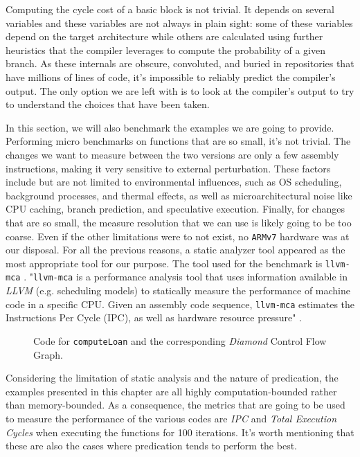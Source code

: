 Computing the cycle cost of a basic block is not trivial. It depends on several variables and these variables are not always in plain sight: some of these variables depend on the target architecture while others are calculated using further heuristics that the compiler leverages to compute the probability of a given branch. As these internals are obscure, convoluted, and buried in repositories that have millions of lines of code, it's impossible to reliably predict the compiler's output. The only option we are left with is to look at the compiler's output to try to understand the choices that have been taken.

In this section, we will also benchmark the examples we are going to provide. Performing micro benchmarks on functions that are so small, it's not trivial. The changes we want to measure between the two versions are only a few assembly instructions, making it very sensitive to external perturbation. These factors include but are not limited to environmental influences, such as OS scheduling, background processes, and thermal effects, as well as microarchitectural noise like CPU caching, branch prediction, and speculative execution. Finally, for changes that are so small, the measure resolution that we can use is likely going to be too coarse.
Even if the other limitations were to not exist, no \texttt{ARMv7} hardware was at our disposal.
For all the previous reasons, a static analyzer tool appeared as the most appropriate tool for our purpose. The tool used for the benchmark is \texttt{llvm-mca} \cite{llvm-mca-rfc}. "\texttt{llvm-mca} is a performance analysis tool that uses information available in \textit{LLVM} (e.g. scheduling models) to statically measure the performance of machine code in a specific CPU. 
Given an assembly code sequence, \texttt{llvm-mca} estimates the Instructions Per Cycle (IPC), as well as hardware resource pressure" \cite{llvm-mca-docs}.


\begin{figure}[H]
    \centering
    
    \caption{Code for \texttt{computeLoan} and the corresponding \textit{Diamond} Control Flow Graph.}
    \label{fig:calculate_loan}
\end{figure}

Considering the limitation of static analysis \cite{ritter2022anica}\cite{tan2024uncovering} and the nature of predication, the examples presented in this chapter are all highly computation-bounded rather than memory-bounded. As a consequence, the metrics that are going to be used to measure the performance of the various codes are \textit{IPC} and \textit{Total Execution Cycles} when executing the functions for 100 iterations.
It's worth mentioning that these are also the cases where predication tends to perform the best.

